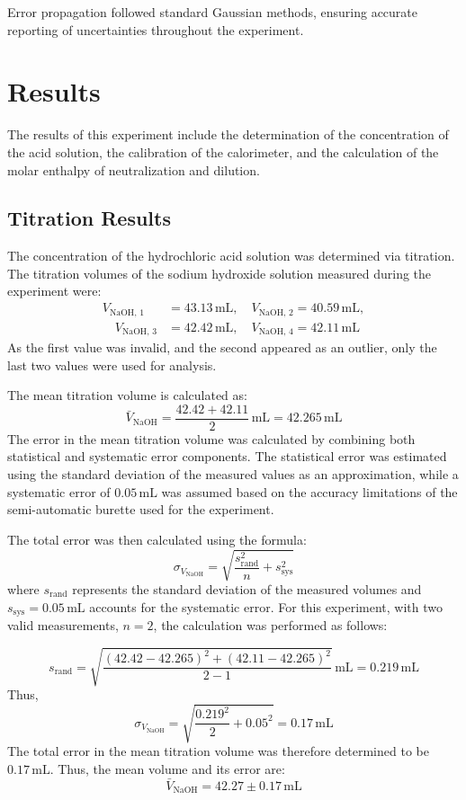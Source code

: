 \documentclass[a4paper,12pt]{article}
\begin{document}
Error propagation followed standard Gaussian methods, ensuring accurate reporting of uncertainties throughout the experiment.


\section{Results}
The results of this experiment include the determination of the concentration of the acid solution, the calibration of the calorimeter, and the calculation of the molar enthalpy of neutralization and dilution. 

\subsection{Titration Results}
The concentration of the hydrochloric acid solution was determined via titration. The titration volumes of the sodium hydroxide solution measured during the experiment were:
\begin{align*}
V_{\text{NaOH, 1}} &= 43.13 \, \text{mL}, \quad V_{\text{NaOH, 2}} = 40.59 \, \text{mL}, \\ \quad V_{\text{NaOH, 3}} &= 42.42 \, \text{mL}, \quad V_{\text{NaOH, 4}} = 42.11 \, \text{mL}
\end{align*}
As the first value was invalid, and the second appeared as an outlier, only the last two values were used for analysis.

The mean titration volume is calculated as:
\[
\bar{V}_{\text{NaOH}} = \frac{42.42 + 42.11}{2}\,\text{mL} = 42.265 \, \text{mL}
\]
The error in the mean titration volume was calculated by combining both statistical and systematic error components. The statistical error was estimated using the standard deviation of the measured values as an approximation, while a systematic error of \(0.05 \, \text{mL}\) was assumed based on the accuracy limitations of the semi-automatic burette used for the experiment.

The total error was then calculated using the formula:
\[
\sigma_{V_{\text{NaOH}}} = \sqrt{\frac{s_{\text{rand}}^2}{n} + s_{\text{sys}}^2}
\]
where \( s_{\text{rand}} \) represents the standard deviation of the measured volumes and \( s_{\text{sys}} = 0.05 \, \text{mL} \) accounts for the systematic error. For this experiment, with two valid measurements, \( n = 2 \), the calculation was performed as follows:

\[
s_{\text{rand}} = \sqrt{\frac{(42.42 - 42.265)^2 + (42.11 - 42.265)^2}{2-1}} \,\text{mL}= 0.219 \, \text{mL}
\]
Thus,
\[
\sigma_{V_{\text{NaOH}}} = \sqrt{\frac{0.219^2}{2} + 0.05^2} = 0.17 \, \text{mL}
\]
The total error in the mean titration volume was therefore determined to be \(0.17 \, \text{mL}\).
Thus, the mean volume and its error are:
\[
\bar{V}_{\text{NaOH}} = 42.27 \pm 0.17 \, \text{mL}
\]
\end{document}
